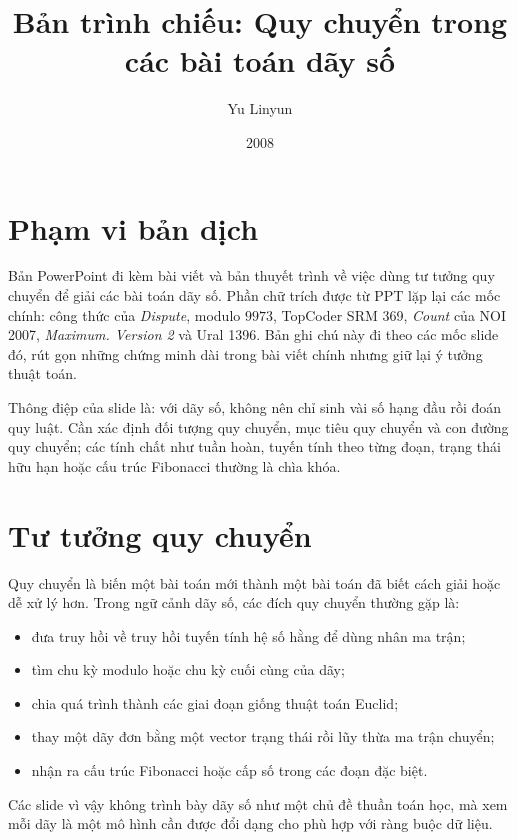 \documentclass[11pt]{article}
\title{Bản trình chiếu: Quy chuyển trong các bài toán dãy số}
\author{Yu Linyun}
\date{2008}
\begin{document}
\maketitle


\section{Phạm vi bản dịch}

Bản PowerPoint đi kèm bài viết và bản thuyết trình về việc dùng tư tưởng quy
chuyển để giải các bài toán dãy số. Phần chữ trích được từ PPT lặp lại các
mốc chính: công thức của \textit{Dispute}, modulo \(9973\), TopCoder SRM 369,
\textit{Count} của NOI 2007, \textit{Maximum. Version 2} và Ural 1396. Bản
ghi chú này đi theo các mốc slide đó, rút gọn những chứng minh dài trong bài
viết chính nhưng giữ lại ý tưởng thuật toán.

Thông điệp của slide là: với dãy số, không nên chỉ sinh vài số hạng đầu rồi
đoán quy luật. Cần xác định đối tượng quy chuyển, mục tiêu quy chuyển và con
đường quy chuyển; các tính chất như tuần hoàn, tuyến tính theo từng đoạn,
trạng thái hữu hạn hoặc cấu trúc Fibonacci thường là chìa khóa.

\section{Tư tưởng quy chuyển}

Quy chuyển là biến một bài toán mới thành một bài toán đã biết cách giải hoặc
dễ xử lý hơn. Trong ngữ cảnh dãy số, các đích quy chuyển thường gặp là:
\begin{itemize}
  \item đưa truy hồi về truy hồi tuyến tính hệ số hằng để dùng nhân ma trận;
  \item tìm chu kỳ modulo hoặc chu kỳ cuối cùng của dãy;
  \item chia quá trình thành các giai đoạn giống thuật toán Euclid;
  \item thay một dãy đơn bằng một vector trạng thái rồi lũy thừa ma trận
  chuyển;
  \item nhận ra cấu trúc Fibonacci hoặc cấp số trong các đoạn đặc biệt.
\end{itemize}

Các slide vì vậy không trình bày dãy số như một chủ đề thuần toán học, mà xem
mỗi dãy là một mô hình cần được đổi dạng cho phù hợp với ràng buộc dữ liệu.
\end{document}
